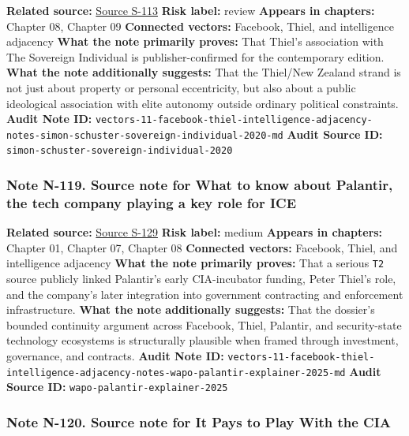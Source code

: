 \documentclass[
  american,
  11pt,
  letterpaper,
]{article}
\begin{document}
\textbf{Related source:}
\hyperref[source-s-113-the-sovereign-individual-official-publisher-page]{Source
S-113} \textbf{Risk label:} review \textbf{Appears in chapters:} Chapter
08, Chapter 09 \textbf{Connected vectors:} Facebook, Thiel, and
intelligence adjacency \textbf{What the note primarily proves:} That
Thiel's association with The Sovereign Individual is publisher-confirmed
for the contemporary edition. \textbf{What the note additionally
suggests:} That the Thiel/New Zealand strand is not just about property
or personal eccentricity, but also about a public ideological
association with elite autonomy outside ordinary political constraints.
\textbf{Audit Note ID:}
\texttt{vectors-11-facebook-thiel-intelligence-adjacency-notes-simon-schuster-sovereign-individual-2020-md}
\textbf{Audit Source ID:}
\texttt{simon-schuster-sovereign-individual-2020}

\subsubsection{Note N-119. Source note for What to know about Palantir,
the tech company playing a key role for
ICE}\label{note-n-119-vectors-11-facebook-thiel-intelligence-adjacency-notes-wapo-palantir-explainer-2025-md}

\textbf{Related source:}
\hyperref[source-s-129-what-to-know-about-palantir-the-tech-company-playing-a-key-role-for-ice]{Source
S-129} \textbf{Risk label:} medium \textbf{Appears in chapters:} Chapter
01, Chapter 07, Chapter 08 \textbf{Connected vectors:} Facebook, Thiel,
and intelligence adjacency \textbf{What the note primarily proves:} That
a serious \texttt{T2} source publicly linked Palantir's early
CIA-incubator funding, Peter Thiel's role, and the company's later
integration into government contracting and enforcement infrastructure.
\textbf{What the note additionally suggests:} That the dossier's bounded
continuity argument across Facebook, Thiel, Palantir, and security-state
technology ecosystems is structurally plausible when framed through
investment, governance, and contracts. \textbf{Audit Note ID:}
\texttt{vectors-11-facebook-thiel-intelligence-adjacency-notes-wapo-palantir-explainer-2025-md}
\textbf{Audit Source ID:} \texttt{wapo-palantir-explainer-2025}

\subsubsection{Note N-120. Source note for It Pays to Play With the
CIA}\label{note-n-120-vectors-11-facebook-thiel-intelligence-adjacency-notes-wired-in-q-tel-cia-2002-md}
\end{document}
